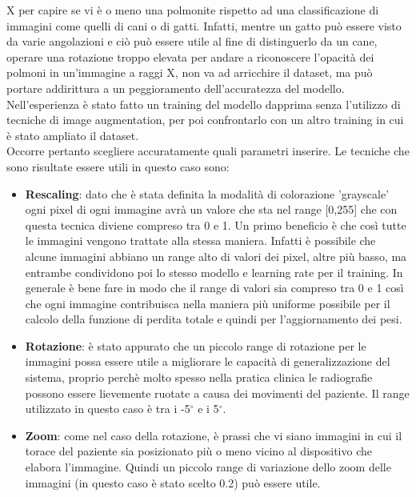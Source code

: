      X per capire se vi è o meno una polmonite rispetto ad una classificazione di immagini come quelli di 
     cani o di gatti. Infatti, mentre un gatto può essere visto da varie angolazioni e ciò può essere
      utile al fine di distinguerlo da un cane, operare una rotazione troppo elevata per andare a riconoscere 
      l’opacità dei polmoni in un’immagine a raggi X, non va ad arricchire il dataset, ma può portare
       addirittura a un peggioramento dell’accuratezza del modello. Nell’esperienza è stato fatto un
        training del modello dapprima senza l’utilizzo di tecniche di image augmentation, per poi confrontarlo
         con un altro training in cui è stato ampliato il dataset. \\

      Occorre pertanto scegliere accuratamente quali parametri inserire. Le tecniche che sono risultate essere utili in questo caso sono:
      \begin{itemize}
        \item \textbf{Rescaling}: dato che è stata definita la modalità di colorazione 'grayscale' ogni pixel di 
        ogni immagine avrà un valore che sta nel range [0,255] che con questa tecnica diviene compreso tra 0 e 1. 
        Un primo beneficio è che così tutte le immagini vengono trattate alla stessa maniera. 
        Infatti è possibile che alcune immagini abbiano un range alto di valori dei pixel, altre più basso,
         ma entrambe condividono poi lo stesso modello e learning rate per il training. 
        In generale è bene fare in modo che il range di valori sia compreso tra 0 e 1 così che ogni immagine
         contribuisca nella maniera più uniforme possibile per il calcolo della funzione di perdita totale e 
         quindi per l'aggiornamento dei pesi. 
        \item \textbf{Rotazione}: è stato appurato che un piccolo range di rotazione per le immagini possa essere
         utile a migliorare le capacità di generalizzazione del sistema, proprio perchè molto spesso nella pratica clinica
         le radiografie possono essere lievemente ruotate a causa dei movimenti del paziente. Il range utilizzato in questo caso è tra i 
         -5$^\circ$  e i 5$^\circ$.
         \item \textbf{Zoom}: come nel caso della rotazione, è prassi che vi siano immagini in cui il torace del paziente sia posizionato
         più o meno vicino al dispositivo che elabora l'immagine. Quindi un piccolo range di variazione dello zoom delle immagini (in questo caso è stato scelto 0.2) 
         può essere utile. 
        
      \end{itemize}


